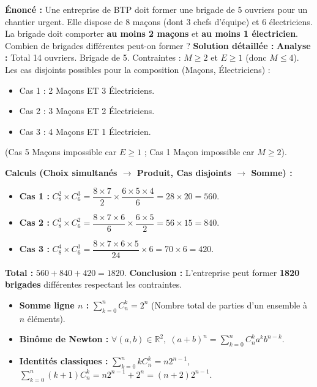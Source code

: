 \documentclass[11pt]{article}
\begin{document}
\begin{exoresolu}
\textbf{Énoncé :} Une entreprise de BTP doit former une brigade de 5 ouvriers pour un chantier urgent. Elle dispose de 8 maçons (dont 3 chefs d'équipe) et 6 électriciens. La brigade doit comporter \textbf{au moins 2 maçons} et \textbf{au moins 1 électricien}. Combien de brigades différentes peut-on former ?
\tcblower
\textbf{Solution détaillée :}
\textbf{Analyse :} Total 14 ouvriers. Brigade de 5. Contraintes : $M \ge 2$ et $E \ge 1$ (donc $M \le 4$).
Les cas disjoints possibles pour la composition (Maçons, Électriciens) :
\begin{itemize}
    \item Cas 1 : 2 Maçons ET 3 Électriciens.
    \item Cas 2 : 3 Maçons ET 2 Électriciens.
    \item Cas 3 : 4 Maçons ET 1 Électricien.
\end{itemize}
(Cas 5 Maçons impossible car $E \ge 1$ ; Cas 1 Maçon impossible car $M \ge 2$).

\textbf{Calculs (Choix simultanés $\rightarrow$ Produit, Cas disjoints $\rightarrow$ Somme) :}
\begin{itemize}
    \item \textbf{Cas 1 :} $C_8^2 \times C_6^3 = \dfrac{8 \times 7}{2} \times \dfrac{6 \times 5 \times 4}{6} = 28 \times 20 = 560$.
    \item \textbf{Cas 2 :} $C_8^3 \times C_6^2 = \dfrac{8 \times 7 \times 6}{6} \times \dfrac{6 \times 5}{2} = 56 \times 15 = 840$.
    \item \textbf{Cas 3 :} $C_8^4 \times C_6^1 = \dfrac{8 \times 7 \times 6 \times 5}{24} \times 6 = 70 \times 6 = 420$.
\end{itemize}
\textbf{Total :} $560 + 840 + 420 = 1820$.
\textbf{Conclusion :} L'entreprise peut former \textbf{1820 brigades} différentes respectant les contraintes.
\end{exoresolu}

\begin{propriete}
\begin{itemize}
    \item \textbf{Somme ligne $n$ :} $\displaystyle\sum_{k=0}^n C_n^k = 2^n$ (Nombre total de parties d'un ensemble à $n$ éléments).
    \item \textbf{Binôme de Newton :} $\forall (a,b) \in \mathbb{R}^2,\; (a+b)^n = \displaystyle\sum_{k=0}^n C_n^k a^k b^{n-k}$.
    \item \textbf{Identités classiques :}
    $\sum_{k=0}^n k C_n^k = n 2^{n-1}$,
    $\sum_{k=0}^n (k+1) C_n^k = n 2^{n-1} + 2^n = (n+2)2^{n-1}$.
\end{itemize}
\end{propriete}
\end{document}
